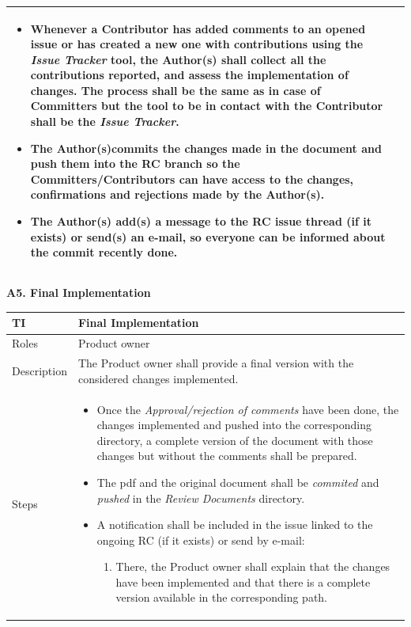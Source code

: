 \documentclass{template/openetcs_article}
\begin{document}
\begin{flushleft}
\begin{supertabular}{|m{2cm}|m{13cm}|}
\begin{itemize}
\begin{enumerate}
\end{enumerate}
\item Whenever a Contributor has added comments to an opened issue or has created a new one with contributions using the {\it Issue Tracker} tool, the Author(s) shall collect all the contributions reported, and assess the implementation of changes. The process shall be the same as in case of Committers but the tool to be in contact with the Contributor shall be the {\it Issue Tracker}.
\item The Author(s)commits the changes made in the document and push them into the RC branch so the Committers/Contributors can have access to the changes, confirmations and rejections made by the Author(s).
\item The Author(s) add(s) a message to the RC issue thread (if it exists) or send(s) an e-mail, so everyone can be informed about the commit recently done. 
\end{itemize}
\\\hline
\end{supertabular}
\end{flushleft}


\textbf{A5. Final Implementation}

\begin{flushleft}
\tablefirsthead{}
\tablehead{}
\tabletail{}
\tablelasttail{}
\begin{supertabular}{|m{2cm}|m{13cm}|}
\hline
{}
TI & 
Final Implementation
\\\hline
Roles &
Product owner
\\\hline
Description &
The Product owner shall provide a final version with the considered changes implemented.  
\\\hline
Steps &
\begin{itemize}
\item Once the {\it Approval/rejection of comments} have been done, the changes implemented and pushed into the corresponding directory, a complete version of the document with those changes but without the comments shall be prepared.
\item The pdf and the original document shall be {\it commited} and {\it pushed} in the {\it Review Documents} directory.
\item A notification shall be included in the issue linked to the ongoing RC (if it exists) or send by e-mail: 
\begin{enumerate}
\item There, the Product owner shall explain that the changes have been implemented and that there is a complete version available in the corresponding path.
\end{enumerate}
\end{itemize}
\\\hline
\end{supertabular}
\end{flushleft}
\end{document}
